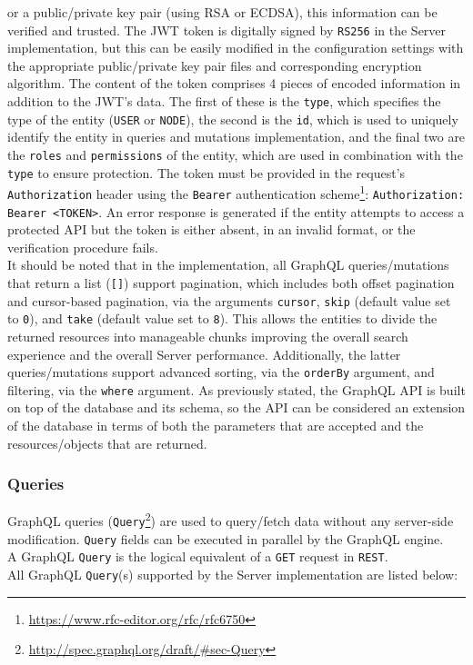 or a public/private key pair (using RSA or ECDSA), this information can be verified
and trusted\cite{rfc_7519}. The JWT token is digitally signed by \texttt{RS256}
in the Server implementation, but this can be easily modified in the configuration
settings with the appropriate public/private key pair files and corresponding encryption
algorithm. The content of the token comprises 4 pieces of encoded information in
addition to the JWT's data. The first of these is the \texttt{type}, which specifies
the type of the entity (\texttt{USER} or \texttt{NODE}), the second is the
\texttt{id}, which is used to uniquely identify the entity in queries and
mutations implementation, and the final two are the \texttt{roles} and \texttt{permissions}
of the entity, which are used in combination with the \texttt{type} to ensure protection.
The token must be provided in the request's \texttt{Authorization} header using the
\texttt{Bearer} authentication scheme\footnote{\url{https://www.rfc-editor.org/rfc/rfc6750}}:
\texttt{Authorization: Bearer <TOKEN>}. An error response is generated if the
entity attempts to access a protected API but the token is either absent, in an invalid
format, or the verification procedure fails. \\ %
It should be noted that in the implementation, all GraphQL queries/mutations that
return a list (\texttt{[]}) support pagination, which includes both offset
pagination and cursor-based pagination, via the arguments \texttt{cursor}, \texttt{skip}
(default value set to \texttt{0}), and \texttt{take} (default value set to
\texttt{8}). This allows the entities to divide the returned resources into manageable
chunks improving the overall search experience and the overall Server performance.
Additionally, the latter queries/mutations support advanced sorting, via the
\texttt{orderBy} argument, and filtering, via the \texttt{where} argument. As previously
stated, the GraphQL API is built on top of the database and its schema, so the API
can be considered an extension of the database in terms of both the parameters that
are accepted and the resources/objects that are returned.

\subsubsection{Queries}
\label{subsubsec:implementation_server_graphql_api_queries}

GraphQL queries (\texttt{Query}\footnote{\url{http://spec.graphql.org/draft/\#sec-Query}})
are used to query/fetch data without any server-side modification. \texttt{Query}
fields can be executed in parallel by the GraphQL engine. \\ %
A GraphQL \texttt{Query} is the logical equivalent of a \texttt{GET} request in \texttt{REST}.
\\ %
All GraphQL \texttt{Query}(s) supported by the Server implementation are listed
below:

